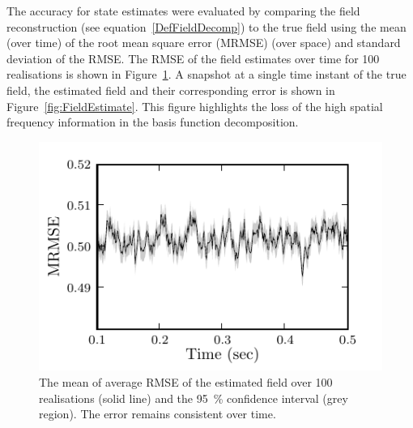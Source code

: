 \documentclass[10pt,a4paper]{article}
\begin{document}
The accuracy for state estimates were evaluated by comparing the field reconstruction (see equation~\ref{DefFieldDecomp}) to the true field using the mean (over time) of the root mean square error (MRMSE) (over space) and standard deviation of the RMSE. The RMSE of the field estimates over time for 100 realisations is shown in Figure~\ref{fig:RMSE}. A snapshot at a single time instant of the true field, the estimated field and their corresponding error is shown in Figure~\ref{fig:FieldEstimate}. This figure highlights the loss of the high spatial frequency information in the basis function decomposition.
  \begin{figure}
   	\begin{center}
   		\includegraphics{./Graph/MRMSE.pdf} 
   	\end{center}
   	\caption{The mean of average RMSE of the estimated field over 100 realisations (solid line) and the 95~\% confidence interval (grey region). The error remains consistent over time.} 
\label{fig:RMSE}
   \end{figure}
  
\end{document}
